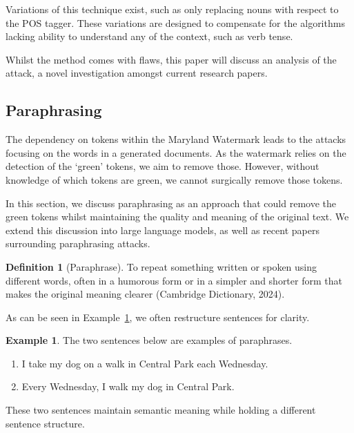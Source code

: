 \documentclass{l4proj}
\theoremstyle{definition}
\newtheorem{definition}{Definition}[section]
\newtheorem{example}{Example}[section]
\begin{document}
        Variations of this technique exist, such as only replacing nouns with respect to the POS tagger. These variations are designed to compensate for the algorithms lacking ability to understand any of the context, such as verb tense.

        Whilst the method comes with flaws, this paper will discuss an analysis of the attack, a novel investigation amongst current research papers.
    
    \subsection{Paraphrasing}
        The dependency on tokens within the Maryland Watermark leads to the attacks focusing on the words in a generated documents. As the watermark relies on the detection of the `green' tokens, we aim to remove those. However, without knowledge of which tokens are green, we cannot surgically remove those tokens. 

        In this section, we discuss paraphrasing as an approach that could remove the green tokens whilst maintaining the quality and meaning of the original text. We extend this discussion into large language models, as well as recent papers surrounding paraphrasing attacks.

        \begin{definition}[Paraphrase]
            \label{def:paraphrase}
            To repeat something written or spoken using different words, often in a humorous form or in a simpler and shorter form that makes the original meaning clearer (Cambridge Dictionary, 2024).
        \end{definition}

        As can be seen in Example~\ref{example:paraphrase}, we often restructure sentences for clarity.

        \begin{example}
            \label{example:paraphrase}
            The two sentences below are examples of paraphrases.
            \begin{enumerate}[label=(\alph*)]
                \item I take my dog on a walk in Central Park each Wednesday. 
                \item Every Wednesday, I walk my dog in Central Park.
            \end{enumerate}
            These two sentences maintain semantic meaning while holding a different sentence structure. 
        \end{example}
\end{document}

